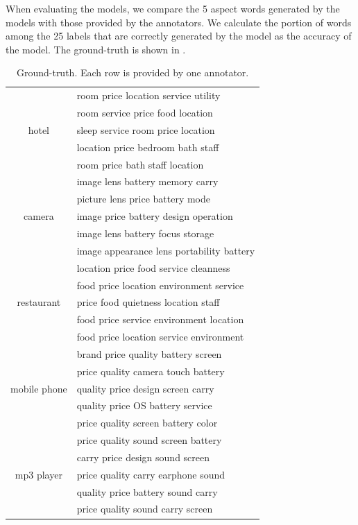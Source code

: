 When evaluating the models, 
we compare the 5 aspect words generated by the models with those provided 
by the annotators. 
We calculate the portion of words among the 25 labels that 
are correctly generated by the model as the accuracy of the model.
The ground-truth is shown
in .
	\begin{table}[th]
		\centering
		\caption{Ground-truth. Each row is provided by one annotator.}
		\label{table:labels}
		\begin{tabular}{|c|l|}
			\hline
			\multirow{5}{*}{hotel}
			& room price location service utility \\
			& room service price food location  \\
			& sleep service room price location  \\
			& location price bedroom bath staff  \\
			& room price bath staff location  \\\hline
			
			\multirow{5}{*}{camera}
			& image lens battery memory carry \\
			& picture lens price battery mode \\
			& image price battery design operation \\
			& image lens battery focus storage \\
			& image appearance lens portability battery \\\hline
			
			\multirow{5}{*}{restaurant}
			& location price food service cleanness \\
			& food price location environment service \\
			& price food quietness location staff \\
			& food price service environment location \\
			& food price location service environment \\\hline
			
			\multirow{5}{*}{mobile phone}
			& brand price quality battery screen \\
			& price quality camera touch battery \\
			& quality price design screen carry \\
			& quality price OS battery service \\
			& price quality screen battery color \\\hline
			
			\multirow{5}{*}{mp3 player}
			& price quality sound screen battery \\
			& carry price design sound screen  \\ 
			& price quality carry earphone sound \\
			& quality price battery sound carry \\
			& price quality sound carry screen
			 \\\hline
			

\end{tabular}
\end{table}
